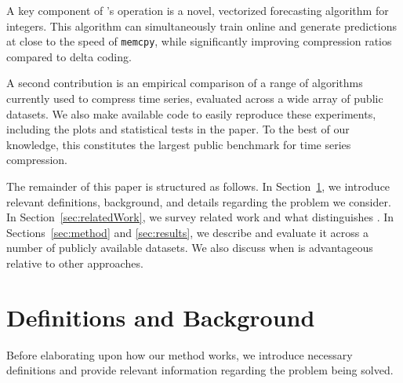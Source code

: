 A key component of \mine's operation is a novel, vectorized forecasting algorithm for integers. This algorithm can simultaneously train online and generate predictions at close to the speed of \texttt{memcpy}, while significantly improving compression ratios compared to delta coding.

A second contribution is an empirical comparison of a range of algorithms currently used to compress time series, evaluated across a wide array of public datasets. We also make available code to easily reproduce these experiments, including the plots and statistical tests in the paper. To the best of our knowledge, this constitutes the largest public benchmark for time series compression.

The remainder of this paper is structured as follows. In Section~\ref{sec:problem}, we introduce relevant definitions, background, and details regarding the problem we consider. In Section~\ref{sec:relatedWork}, we survey related work and what distinguishes \mine. In Sections~\ref{sec:method} and \ref{sec:results}, we describe \minesp and evaluate it across a number of publicly available datasets. We also discuss when \minesp is advantageous relative to other approaches.





\section{Definitions and Background} \label{sec:problem}

Before elaborating upon how our method works, we introduce necessary definitions and provide relevant information regarding the problem being solved.

